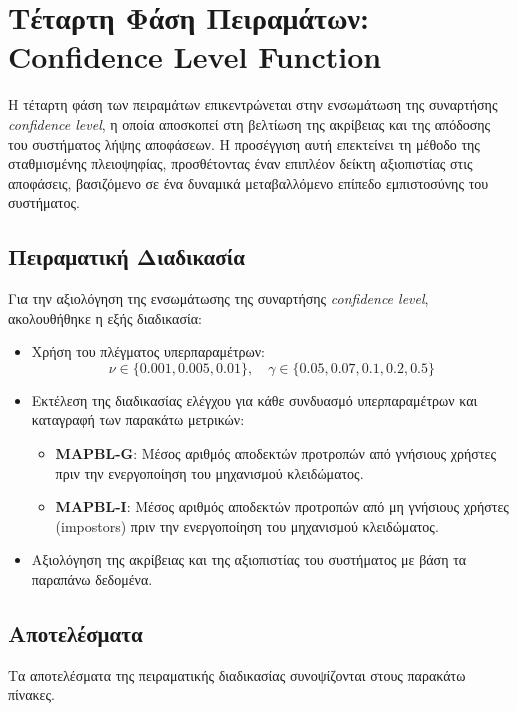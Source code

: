 \section{Τέταρτη Φάση Πειραμάτων: Confidence Level Function}
\label{sec:experiments_phase4}

Η τέταρτη φάση των πειραμάτων επικεντρώνεται στην ενσωμάτωση της συναρτήσης \textit{confidence level}, η οποία αποσκοπεί στη βελτίωση της ακρίβειας και της απόδοσης του συστήματος λήψης αποφάσεων. Η προσέγγιση αυτή επεκτείνει τη μέθοδο της σταθμισμένης πλειοψηφίας, προσθέτοντας έναν επιπλέον δείκτη αξιοπιστίας στις αποφάσεις, βασιζόμενο σε ένα δυναμικά μεταβαλλόμενο επίπεδο εμπιστοσύνης του συστήματος.

\subsection{Πειραματική Διαδικασία}
Για την αξιολόγηση της ενσωμάτωσης της συναρτήσης \textit{confidence level}, ακολουθήθηκε η εξής διαδικασία:
\begin{itemize}
    \item Χρήση του πλέγματος υπερπαραμέτρων:
    \[
    \nu \in \{0.001, 0.005, 0.01\}, \quad \gamma \in \{0.05, 0.07, 0.1, 0.2, 0.5\}
    \]
    \item Εκτέλεση της διαδικασίας ελέγχου για κάθε συνδυασμό υπερπαραμέτρων και καταγραφή των παρακάτω μετρικών:
    \begin{itemize}
        \item \textbf{MAPBL-G}: Μέσος αριθμός αποδεκτών προτροπών από γνήσιους χρήστες πριν την ενεργοποίηση του μηχανισμού κλειδώματος.
        \item \textbf{MAPBL-I}: Μέσος αριθμός αποδεκτών προτροπών από μη γνήσιους χρήστες (impostors) πριν την ενεργοποίηση του μηχανισμού κλειδώματος.
    \end{itemize}
    \item Αξιολόγηση της ακρίβειας και της αξιοπιστίας του συστήματος με βάση τα παραπάνω δεδομένα.
\end{itemize}

\subsection{Αποτελέσματα}
Τα αποτελέσματα της πειραματικής διαδικασίας συνοψίζονται στους παρακάτω πίνακες.

